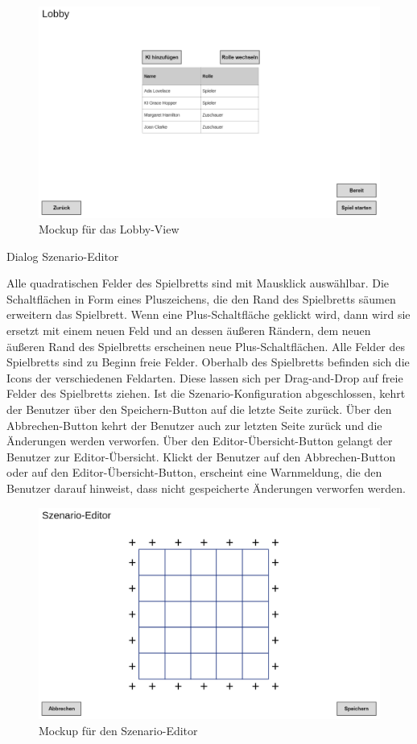 \begin{figure}
  \centering
  \includegraphics[width=\textwidth]{Meilenstein03/Lobby_Mockup.png}
  \caption{Mockup für das Lobby-View}
\end{figure}

Dialog \glqq{}Szenario-Editor\grqq{}

Alle quadratischen Felder des Spielbretts sind mit Mausklick auswählbar. Die Schaltflächen in Form eines Pluszeichens, die den Rand des Spielbretts säumen erweitern das Spielbrett. Wenn eine Plus-Schaltfläche geklickt wird, dann wird sie ersetzt mit einem neuen Feld und an dessen äußeren Rändern, dem neuen äußeren Rand des Spielbretts erscheinen neue Plus-Schaltflächen. Alle Felder des Spielbretts sind zu Beginn freie Felder. Oberhalb des Spielbretts befinden sich die Icons der verschiedenen Feldarten. Diese lassen sich per Drag-and-Drop auf freie Felder des Spielbretts ziehen. Ist die Szenario-Konfiguration abgeschlossen, kehrt der Benutzer über den Speichern-Button auf die letzte Seite zurück. Über den Abbrechen-Button kehrt der Benutzer auch zur letzten Seite zurück und die Änderungen werden verworfen. Über den Editor-Übersicht-Button gelangt der Benutzer zur Editor-Übersicht. Klickt der Benutzer auf den Abbrechen-Button oder auf den Editor-Übersicht-Button, erscheint eine Warnmeldung, die den Benutzer darauf hinweist, dass nicht gespeicherte Änderungen verworfen werden.

\begin{figure}
  \centering
  \includegraphics[width=\textwidth]{Meilenstein03/Szenario-Editor_Mockup.png}
  \caption{Mockup für den Szenario-Editor}
\end{figure}

